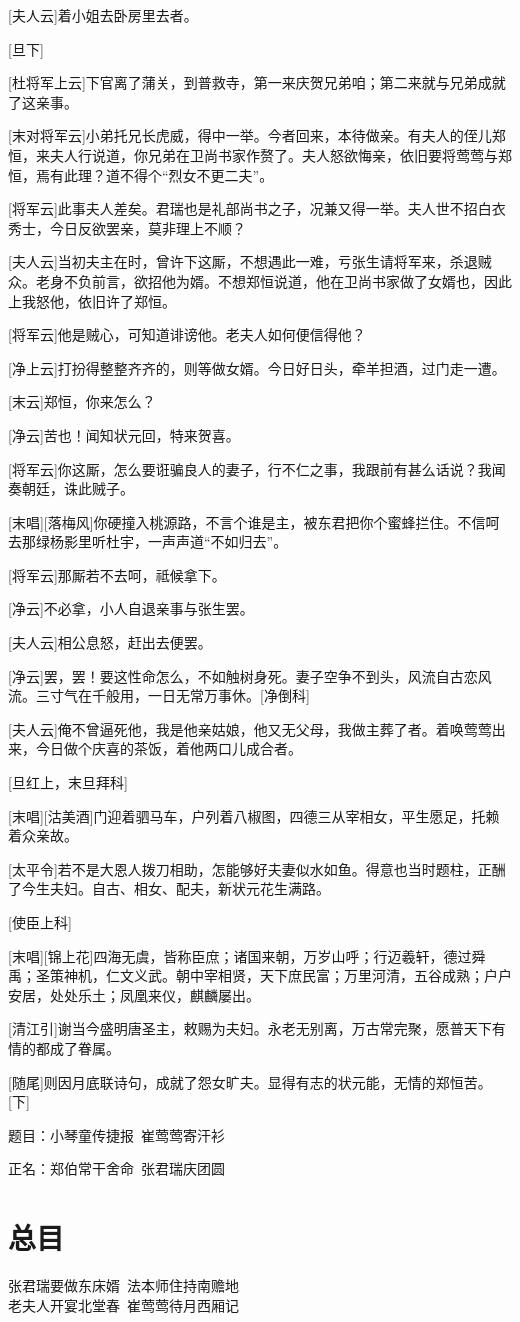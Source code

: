 \documentclass{book}
\begin{document}
[夫人云]着小姐去卧房里去者。

[旦下]

[杜将军上云]下官离了蒲关，到普救寺，第一来庆贺兄弟咱；第二来就与兄弟成就了这亲事。

[末对将军云]小弟托兄长虎威，得中一举。今者回来，本待做亲。有夫人的侄儿郑恒，来夫人行说道，你兄弟在卫尚书家作赘了。夫人怒欲悔亲，依旧要将莺莺与郑恒，焉有此理？道不得个``烈女不更二夫''。

[将军云]此事夫人差矣。君瑞也是礼部尚书之子，况兼又得一举。夫人世不招白衣秀士，今日反欲罢亲，莫非理上不顺？

[夫人云]当初夫主在时，曾许下这厮，不想遇此一难，亏张生请将军来，杀退贼众。老身不负前言，欲招他为婿。不想郑恒说道，他在卫尚书家做了女婿也，因此上我怒他，依旧许了郑恒。

[将军云]他是贼心，可知道诽谤他。老夫人如何便信得他？

[净上云]打扮得整整齐齐的，则等做女婿。今日好日头，牵羊担酒，过门走一遭。

[末云]郑恒，你来怎么？

[净云]苦也！闻知状元回，特来贺喜。

[将军云]你这厮，怎么要诳骗良人的妻子，行不仁之事，我跟前有甚么话说？我闻奏朝廷，诛此贼子。

[末唱][落梅风]你硬撞入桃源路，不言个谁是主，被东君把你个蜜蜂拦住。不信呵去那绿杨影里听杜宇，一声声道``不如归去''。

[将军云]那厮若不去呵，祗候拿下。

[净云]不必拿，小人自退亲事与张生罢。

[夫人云]相公息怒，赶出去便罢。

[净云]罢，罢！要这性命怎么，不如触树身死。妻子空争不到头，风流自古恋风流。三寸气在千般用，一日无常万事休。[净倒科]

[夫人云]俺不曾逼死他，我是他亲姑娘，他又无父母，我做主葬了者。着唤莺莺出来，今日做个庆喜的茶饭，着他两口儿成合者。

[旦红上，末旦拜科]

[末唱][沽美酒]门迎着驷马车，户列着八椒图，四德三从宰相女，平生愿足，托赖着众亲故。

[太平令]若不是大恩人拨刀相助，怎能够好夫妻似水如鱼。得意也当时题柱，正酬了今生夫妇。自古、相女、配夫，新状元花生满路。

[使臣上科]

[末唱][锦上花]四海无虞，皆称臣庶；诸国来朝，万岁山呼；行迈羲轩，德过舜禹；圣策神机，仁文义武。朝中宰相贤，天下庶民富；万里河清，五谷成熟；户户安居，处处乐土；凤凰来仪，麒麟屡出。

[清江引]谢当今盛明唐圣主，敕赐为夫妇。永老无别离，万古常完聚，愿普天下有情的都成了眷属。

[随尾]则因月底联诗句，成就了怨女旷夫。显得有志的状元能，无情的郑恒苦。[下]

\newpage

题目：小琴童传捷报\ 崔莺莺寄汗衫

正名：郑伯常干舍命\ 张君瑞庆团圆

\chapter*{总目}

张君瑞要做东床婿\ 法本师住持南赡地\\
老夫人开宴北堂春\ 崔莺莺待月西厢记
\end{document}
